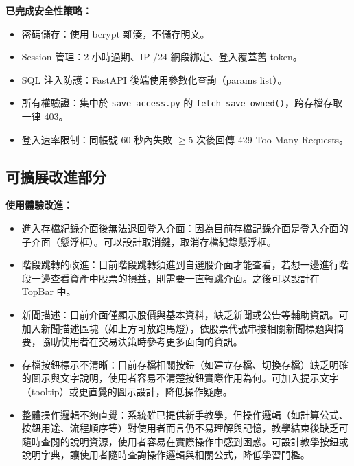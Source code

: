 \documentclass[UTF8, a4paper, 12pt, fontset=none]{ctexart}
\begin{document}
\textbf{已完成安全性策略：}
\begin{itemize}
    \item 密碼儲存：使用 bcrypt 雜湊，不儲存明文。
    \item Session 管理：2 小時過期、IP /24 網段綁定、登入覆蓋舊 token。
    \item SQL 注入防護：FastAPI 後端使用參數化查詢（params list）。
    \item 所有權驗證：集中於 \texttt{save\_access.py} 的 \texttt{fetch\_save\_owned()}，跨存檔存取一律 403。
    \item 登入速率限制：同帳號 60 秒內失敗 $\ge 5$ 次後回傳 429 Too Many Requests。
\end{itemize}

\subsection{可擴展改進部分}

\textbf{使用體驗改進：}
\begin{itemize}
    \item 進入存檔紀錄介面後無法退回登入介面：因為目前存檔記錄介面是登入介面的子介面（懸浮框）。可以設計取消鍵，取消存檔紀錄懸浮框。
    \item 階段跳轉的改進：目前階段跳轉須進到自選股介面才能查看，若想一邊進行階段一邊查看資產中股票的損益，則需要一直轉跳介面。之後可以設計在 TopBar 中。
    \item 新聞描述：目前介面僅顯示股價與基本資料，缺乏新聞或公告等輔助資訊。可加入新聞描述區塊（如上方可放跑馬燈），依股票代號串接相關新聞標題與摘要，協助使用者在交易決策時參考更多面向的資訊。
    \item 存檔按鈕標示不清晰：目前存檔相關按鈕（如建立存檔、切換存檔）缺乏明確的圖示與文字說明，使用者容易不清楚按鈕實際作用為何。可加入提示文字（tooltip）或更直覺的圖示設計，降低操作疑慮。
    \item 整體操作邏輯不夠直覺：系統雖已提供新手教學，但操作邏輯（如計算公式、按鈕用途、流程順序等）對使用者而言仍不易理解與記憶，教學結束後缺乏可隨時查閱的說明資源，使用者容易在實際操作中感到困惑。可設計教學按鈕或說明字典，讓使用者隨時查詢操作邏輯與相關公式，降低學習門檻。
\end{itemize}
\end{document}
